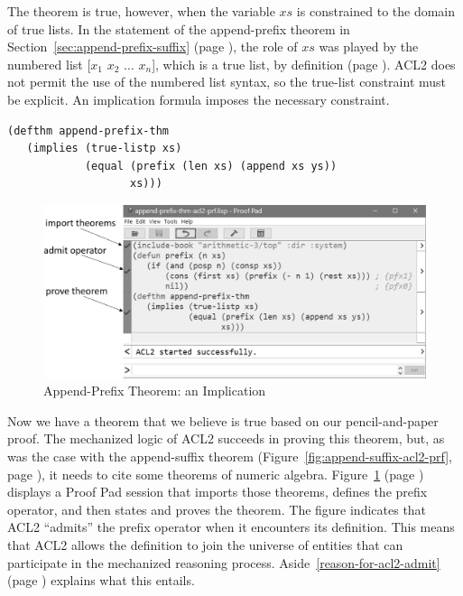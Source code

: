 The theorem is true, however, when the variable $xs$ is
constrained to the domain of true lists.
In the statement of the append-prefix theorem in
Section~\ref{sec:append-prefix-suffix} (page \pageref{append-prefix-thm-predicate}),
the role of $xs$ was played by the numbered list
\textsf{[$x_1$ $x_2$ $\dots$ $x_n$]},
which is a true list, by definition
(page \pageref{numbered-list-interpretation}).
ACL2 does not permit the use of the numbered list syntax,
so the true-list constraint must be explicit.
An implication formula imposes the necessary constraint.

\begin{Verbatim}
(defthm append-prefix-thm
   (implies (true-listp xs)
            (equal (prefix (len xs) (append xs ys))
                   xs)))
\end{Verbatim}

\begin{figure}
\begin{center}
\includegraphics[scale=0.43]{images/append-prefix-thm-acl2-prf-bw.png}
\end{center}
\caption{Append-Prefix Theorem: an Implication}
\label{fig:append-prefix-acl2-prf}
\end{figure}

Now we have a theorem that we believe is true
based on our pencil-and-paper proof.
The mechanized logic of ACL2
succeeds in proving this theorem, but, as was the case with
the append-suffix theorem
(Figure~\ref{fig:append-suffix-acl2-prf}, page \pageref{fig:append-suffix-acl2-prf}),
it needs to cite some theorems of numeric algebra.
Figure~\ref{fig:append-prefix-acl2-prf} (page \pageref{fig:append-prefix-acl2-prf})
displays a Proof Pad session that imports those theorems,
defines the prefix operator, and then states and proves the theorem.
The figure indicates that ACL2
``admits''
the prefix operator when it encounters its definition.
This means that ACL2 allows the definition to join
the universe of entities that can participate in
the mechanized reasoning process.
Aside~\ref{reason-for-acl2-admit} (page \pageref{reason-for-acl2-admit})
explains what this entails.

